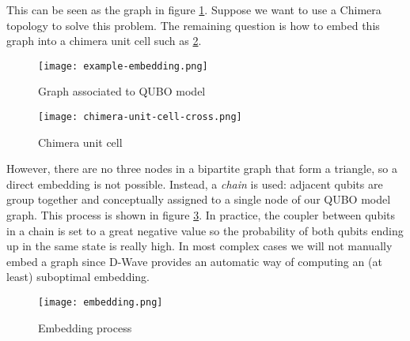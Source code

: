 This can be seen as the graph in figure \ref{fig:example-embedding}. Suppose we want to use a Chimera topology to solve this problem. The remaining question is how to embed this graph into a chimera unit cell such as \ref{fig:chimera-unit-cell-cross}. 

\begin{figure}[H]
	\texttt{[image: example-embedding.png]}
	\centering
	\caption{Graph associated to QUBO model \cite{DWaveDoc-MinorEmbedding}}
	\label{fig:example-embedding}
\end{figure}

\begin{figure}[H]
	\texttt{[image: chimera-unit-cell-cross.png]}
	\centering
	\caption{Chimera unit cell \cite{DWaveDoc-MinorEmbedding}}
	\label{fig:chimera-unit-cell-cross}
\end{figure}

However, there are no three nodes in a bipartite graph that form a triangle, so a direct embedding is not possible. Instead, a \emph{chain} is used: adjacent qubits are group together and conceptually assigned to a single node of our QUBO model graph. This process is shown in figure \ref{fig:embedding}. In practice, the coupler between qubits in a chain is set to a great negative value so the probability of both qubits ending up in the same state is really high. In most complex cases we will not manually embed a graph since D-Wave provides an automatic way of computing an (at least) suboptimal embedding.

\begin{figure}[H]
	\texttt{[image: embedding.png]}
	\centering
	\caption{Embedding process \cite{DWaveDoc-MinorEmbedding}}
	\label{fig:embedding}
\end{figure}
